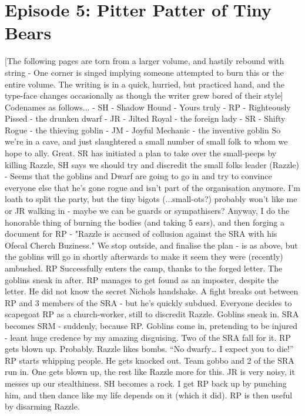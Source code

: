 \section{Episode 5: Pitter Patter of Tiny Bears}

[The following pages are torn from a larger volume, and hastily rebound with string - One corner is singed implying someone attempted to burn this or the entire volume.
The writing is in a quick, hurried, but practiced hand, and the type-face changes occasionally as though the writer grew bored of their style]
Codenames as follows...
- SH - Shadow Hound - Yours truly
- RP - Righteously Pissed - the drunken dwarf
- JR - Jilted Royal - the foreign lady
- SR - Shifty Rogue - the thieving goblin
- JM - Joyful Mechanic - the inventive goblin
So we’re in a cave, and just slaughtered a small number of small folk to whom we hope to ally. Great.
SR has initiated a plan to take over the small-peeps by killing Razzle, SH says we should try and discredit the small folks leader (Razzle) - Seems that the goblins and Dwarf are going to go in and try to convince everyone else that he’s gone rogue and isn’t part of the organisation anymore.
I’m loath to split the party, but the tiny bigots (...small-ots?) probably won’t like me or JR walking in - maybe we can be guards or sympathisers?
Anyway, I do the honorable thing of burning the bodies (and taking 5 ears), and then forging a document for RP -
"Razzle is accused of collusion against the SRA with his Ofecal Cherch Buziness."
We stop outside, and finalise the plan - is as above, but the goblins will go in shortly afterwards to make it seem they were (recently) ambushed.
RP Successfully enters the camp, thanks to the forged letter. The goblins sneak in after. RP manages to get found as an imposter, despite the letter. He did not know the secret Nichols handshake.
A fight breaks out between RP and 3 members of the SRA - but he’s quickly subdued.
Everyone decides to scapegoat RP as a church-worker, still to discredit Razzle. Goblins sneak in.
SRA becomes SRM - suddenly, because RP.
Goblins come in, pretending to be injured - leant huge credence by my amazing disguising. Two of the SRA fall for it.
RP gets blown up. Probably. Razzle likes bombs. “No dwarfy… I expect you to die!”
RP starts whipping people. He gets knocked out.
Team gobbo and 2 of the SRA run in. One gets blown up, the rest like Razzle more for this.
JR is very noisy, it messes up our stealthiness.
SH becomes a rock.
I get RP back up by punching him, and then dance like my life depends on it (which it did).
RP is then useful by disarming Razzle.
